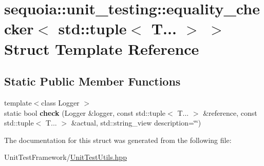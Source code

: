\hypertarget{structsequoia_1_1unit__testing_1_1equality__checker_3_01std_1_1tuple_3_01_t_8_8_8_01_4_01_4}{}\section{sequoia\+::unit\+\_\+testing\+::equality\+\_\+checker$<$ std\+::tuple$<$ T... $>$ $>$ Struct Template Reference}
\label{structsequoia_1_1unit__testing_1_1equality__checker_3_01std_1_1tuple_3_01_t_8_8_8_01_4_01_4}
\subsection*{Static Public Member Functions}
\begin{DoxyCompactItemize}
\item 
\mbox{\label{structsequoia_1_1unit__testing_1_1equality__checker_3_01std_1_1tuple_3_01_t_8_8_8_01_4_01_4_addfbeabb2491f2b88e1a540335dd4740}} 
{\footnotesize template$<$class Logger $>$ }\\static bool {\bfseries check} (Logger \&logger, const std\+::tuple$<$ T... $>$ \&reference, const std\+::tuple$<$ T... $>$ \&actual, std\+::string\+\_\+view description=\char`\"{}\char`\"{})
\end{DoxyCompactItemize}


The documentation for this struct was generated from the following file\+:\begin{DoxyCompactItemize}
\item 
Unit\+Test\+Framework/\mbox{\hyperlink{_unit_test_utils_8hpp}{Unit\+Test\+Utils.\+hpp}}\end{DoxyCompactItemize}
